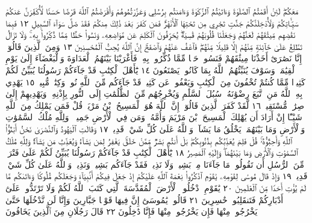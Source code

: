 مَعَكُمْۖ لَئِنْ أَقَمْتُمُ ٱلصَّلَوٰةَ وَءَاتَيْتُمُ ٱلزَّكَوٰةَ
وَءَامَنتُم بِرُسُلِي وَعَزَّرْتُمُوهُمْ وَأَقْرَضْتُمُ ٱللَّهَ قَرْضًا
حَسَنࣰا لَّأُكَفِّرَنَّ عَنكُمْ سَيِّـَٔاتِكُمْ وَلَأُدْخِلَنَّكُمْ
جَنَّٰتࣲ تَجْرِي مِن تَحْتِهَا ٱلْأَنْهَٰرُۚ فَمَن كَفَرَ بَعْدَ ذَٰلِكَ
مِنكُمْ فَقَدْ ضَلَّ سَوَآءَ ٱلسَّبِيلِ ١٢ فَبِمَا نَقْضِهِم
مِّيثَٰقَهُمْ لَعَنَّٰهُمْ وَجَعَلْنَا قُلُوبَهُمْ قَٰسِيَةࣰۖ يُحَرِّفُونَ
ٱلْكَلِمَ عَن مَّوَاضِعِهِۦ وَنَسُوا۟ حَظࣰّا مِّمَّا ذُكِّرُوا۟
بِهِۦۚ وَلَا تَزَالُ تَطَّلِعُ عَلَىٰ خَآئِنَةࣲ مِّنْهُمْ إِلَّا قَلِيلࣰا مِّنْهُمْۖ
فَٱعْفُ عَنْهُمْ وَٱصْفَحْۚ إِنَّ ٱللَّهَ يُحِبُّ ٱلْمُحْسِنِينَ ١٣
وَمِنَ ٱلَّذِينَ قَالُوٓا۟ إِنَّا نَصَٰرَىٰٓ أَخَذْنَا مِيثَٰقَهُمْ فَنَسُوا۟
حَظࣰّا مِّمَّا ذُكِّرُوا۟ بِهِۦ فَأَغْرَيْنَا بَيْنَهُمُ ٱلْعَدَاوَةَ
وَٱلْبَغْضَآءَ إِلَىٰ يَوْمِ ٱلْقِيَٰمَةِۚ وَسَوْفَ يُنَبِّئُهُمُ ٱللَّهُ
بِمَا كَانُوا۟ يَصْنَعُونَ ١٤ يَٰٓأَهْلَ ٱلْكِتَٰبِ قَدْ
جَآءَكُمْ رَسُولُنَا يُبَيِّنُ لَكُمْ كَثِيرࣰا مِّمَّا
كُنتُمْ تُخْفُونَ مِنَ ٱلْكِتَٰبِ وَيَعْفُوا۟ عَن كَثِيرࣲۚ
قَدْ جَآءَكُم مِّنَ ٱللَّهِ نُورࣱ وَكِتَٰبࣱ مُّبِينࣱ ١٥
يَهْدِي بِهِ ٱللَّهُ مَنِ ٱتَّبَعَ رِضْوَٰنَهُۥ سُبُلَ ٱلسَّلَٰمِ
وَيُخْرِجُهُم مِّنَ ٱلظُّلُمَٰتِ إِلَى ٱلنُّورِ بِإِذْنِهِۦ
وَيَهْدِيهِمْ إِلَىٰ صِرَٰطࣲ مُّسْتَقِيمࣲ ١٦ لَّقَدْ كَفَرَ
ٱلَّذِينَ قَالُوٓا۟ إِنَّ ٱللَّهَ هُوَ ٱلْمَسِيحُ ٱبْنُ مَرْيَمَۚ
قُلْ فَمَن يَمْلِكُ مِنَ ٱللَّهِ شَيْـًٔا إِنْ أَرَادَ أَن يُهْلِكَ
ٱلْمَسِيحَ ٱبْنَ مَرْيَمَ وَأُمَّهُۥ وَمَن فِي ٱلْأَرْضِ
جَمِيعࣰاۗ وَلِلَّهِ مُلْكُ ٱلسَّمَٰوَٰتِ وَٱلْأَرْضِ وَمَا بَيْنَهُمَاۚ
يَخْلُقُ مَا يَشَآءُۚ وَٱللَّهُ عَلَىٰ كُلِّ شَيْءࣲ قَدِيرࣱ ١٧
وَقَالَتِ ٱلْيَهُودُ وَٱلنَّصَٰرَىٰ نَحْنُ أَبْنَٰٓؤُا۟ ٱللَّهِ وَأَحِبَّٰٓؤُهُۥۚ قُلْ
فَلِمَ يُعَذِّبُكُم بِذُنُوبِكُمۖ بَلْ أَنتُم بَشَرࣱ مِّمَّنْ خَلَقَۚ يَغْفِرُ لِمَن
يَشَآءُ وَيُعَذِّبُ مَن يَشَآءُۚ وَلِلَّهِ مُلْكُ ٱلسَّمَٰوَٰتِ وَٱلْأَرْضِ
وَمَا بَيْنَهُمَاۖ وَإِلَيْهِ ٱلْمَصِيرُ ١٨ يَٰٓأَهْلَ ٱلْكِتَٰبِ قَدْ جَآءَكُمْ
رَسُولُنَا يُبَيِّنُ لَكُمْ عَلَىٰ فَتْرَةࣲ مِّنَ ٱلرُّسُلِ أَن تَقُولُوا۟ مَا جَآءَنَا
مِنۢ بَشِيرࣲ وَلَا نَذِيرࣲۖ فَقَدْ جَآءَكُم بَشِيرࣱ وَنَذِيرࣱۗ وَٱللَّهُ عَلَىٰ كُلِّ
شَيْءࣲ قَدِيرࣱ ١٩ وَإِذْ قَالَ مُوسَىٰ لِقَوْمِهِۦ يَٰقَوْمِ ٱذْكُرُوا۟
نِعْمَةَ ٱللَّهِ عَلَيْكُمْ إِذْ جَعَلَ فِيكُمْ أَنۢبِيَآءَ وَجَعَلَكُم مُّلُوكࣰا
وَءَاتَىٰكُم مَّا لَمْ يُؤْتِ أَحَدࣰا مِّنَ ٱلْعَٰلَمِينَ ٢٠ يَٰقَوْمِ ٱدْخُلُوا۟
ٱلْأَرْضَ ٱلْمُقَدَّسَةَ ٱلَّتِي كَتَبَ ٱللَّهُ لَكُمْ وَلَا تَرْتَدُّوا۟
عَلَىٰٓ أَدْبَارِكُمْ فَتَنقَلِبُوا۟ خَٰسِرِينَ ٢١ قَالُوا۟ يَٰمُوسَىٰٓ إِنَّ
فِيهَا قَوْمࣰا جَبَّارِينَ وَإِنَّا لَن نَّدْخُلَهَا حَتَّىٰ يَخْرُجُوا۟ مِنْهَا فَإِن
يَخْرُجُوا۟ مِنْهَا فَإِنَّا دَٰخِلُونَ ٢٢ قَالَ رَجُلَانِ مِنَ ٱلَّذِينَ يَخَافُونَ
